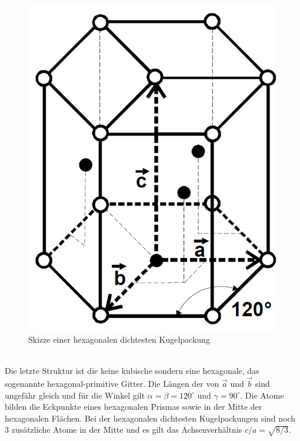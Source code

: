 \begin{figure}[h!]
	\centering
	\includegraphics[scale=0.2]{../Grafiken/HexagonalesGitter.pdf}
	\caption{Skizze einer hexagonalen dichtesten Kugelpackung}
\end{figure}\\
Die letzte Struktur ist die keine kubische sondern eine hexagonale, das sogenannte hexagonal-primitive Gitter. Die Längen der von $\vec{a}$ und $\vec{b}$ sind ungefähr gleich und für die Winkel gilt $\alpha=\beta=120^\circ$ und $\gamma=90^\circ$. Die Atome bilden die Eckpunkte eines hexagonalen Prismas sowie in der Mitte der hexagonalen Flächen. Bei der hexagonalen dichtesten Kugelpackungen sind noch 3 zusätzliche Atome in der Mitte und es gilt das Achsenverhältnis $c/a=\sqrt{8/3}$. 


